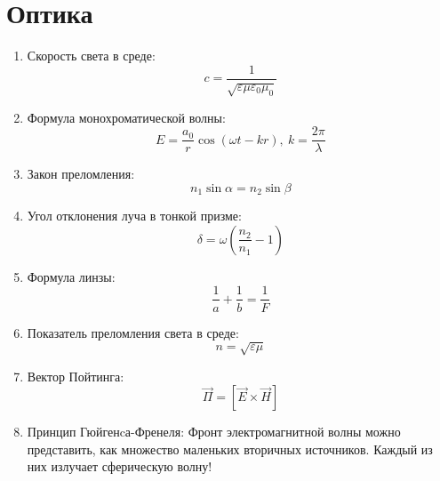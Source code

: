 	\section{Оптика}
	\begin{enumerate}
		\item Скорость света в среде: \[ c = \frac{1}{\sqrt{\varepsilon \mu \varepsilon_0 \mu_0}} \]
		\item Формула монохроматической волны: \[ E = \frac{a_0}{r} \cos(\omega t - kr), \ k = \frac{2 \pi}{\lambda} \]
		\item Закон преломления: \[ n_1 \sin{\alpha} = n_2 \sin{\beta} \]
		\item Угол отклонения луча в тонкой призме: \[ \delta = \omega \left( \frac{n_2}{n_1} - 1 \right) \]
		\item Формула линзы: \[ \frac{1}{a} + \frac{1}{b} = \frac{1}{F} \]
		\item Показатель преломления света в среде: \[ n = \sqrt{\varepsilon \mu} \]
		\item Вектор Пойтинга: \[ \overrightarrow{\Pi} = \left[ \overrightarrow{E} \times \overrightarrow{H} \right] \]
		\item Принцип Гюйгенcа-Френеля: Фронт электромагнитной волны можно представить, как множество маленьких вторичных источников. Каждый из них излучает сферическую волну!
	\end{enumerate}
	
